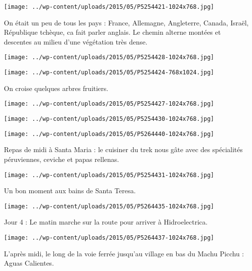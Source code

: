 \centerline{\texttt{[image: ../wp-content/uploads/2015/05/P5254421-1024x768.jpg]} } 
 \newline
 On était un peu de tous les pays : France, Allemagne, Angleterre, Canada, Israël, République tchèque, ca fait parler anglais. \newline
 Le chemin alterne montées et descentes au milieu d'une végétation très dense. \newline
 \newline
\centerline{\texttt{[image: ../wp-content/uploads/2015/05/P5254428-1024x768.jpg]} } 
 \newline
 \newline
\centerline{\texttt{[image: ../wp-content/uploads/2015/05/P5254424-768x1024.jpg]} } 
 \newline
 On croise quelques arbres fruitiers. \newline
 \newline
\centerline{\texttt{[image: ../wp-content/uploads/2015/05/P5254427-1024x768.jpg]} } 
 \newline
 \newline
\centerline{\texttt{[image: ../wp-content/uploads/2015/05/P5254430-1024x768.jpg]} } 
 \newline
 \newline
\centerline{\texttt{[image: ../wp-content/uploads/2015/05/P5264440-1024x768.jpg]} } 
 \newline
 Repas de midi à Santa Maria : le cuisiner du trek nous gâte avec des spécialités péruviennes, ceviche et papas rellenas. \newline
 \newline
\centerline{\texttt{[image: ../wp-content/uploads/2015/05/P5254431-1024x768.jpg]} } 
 \newline
 Un bon moment aux bains de Santa Teresa. \newline
 \newline
\centerline{\texttt{[image: ../wp-content/uploads/2015/05/P5264435-1024x768.jpg]} } 
 \newline
 Jour 4 : \newline
 Le matin marche sur la route pour arriver à Hidroelectrica. \newline
 \newline
\centerline{\texttt{[image: ../wp-content/uploads/2015/05/P5264437-1024x768.jpg]} } 
 \newline
 L'après midi, le long de la voie ferrée jusqu'au village en bas du Machu Picchu : Aguas Calientes. \newline
